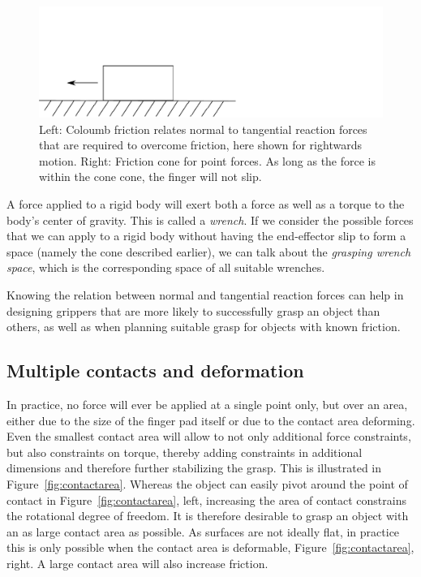 \begin{figure}
\includegraphics[width=\columnwidth]{figs/coulombfriction}
\caption{Left: Coloumb friction relates normal to tangential reaction forces that are required to overcome friction, here shown for rightwards motion. Right: Friction cone for point forces. As long as the force is within the cone cone, the finger will not slip.} 
\end{figure}

A force applied to a rigid body will exert both a force as well as a torque to the body's center of gravity. This is called a \emph{wrench}. If we consider the possible forces that we can apply to a rigid body without having the end-effector slip to form a space (namely the cone described earlier), we can talk about the \emph{grasping wrench space}, which is the corresponding space of all suitable wrenches.

Knowing the relation between normal and tangential reaction forces can help in designing grippers that are more likely to successfully grasp an object than others, as well as when planning suitable grasp for objects with known friction.


\subsection{Multiple contacts and deformation}
In practice, no force will ever be applied at a single point only, but over an area, either due to the size of the finger pad itself or due to the contact area deforming. Even the smallest contact area will allow to not only additional force constraints, but also constraints on torque, thereby adding constraints in additional dimensions and therefore further stabilizing the grasp. This is illustrated in Figure~\ref{fig:contactarea}. Whereas the object can easily pivot around the point of contact in Figure~\ref{fig:contactarea}, left, increasing the area of contact constrains the rotational degree of freedom. It is therefore desirable to grasp an object with an as large contact area as possible. As surfaces are not ideally flat, in practice this is only possible when the contact area is deformable, Figure~\ref{fig:contactarea}, right. A large contact area will also increase friction.

